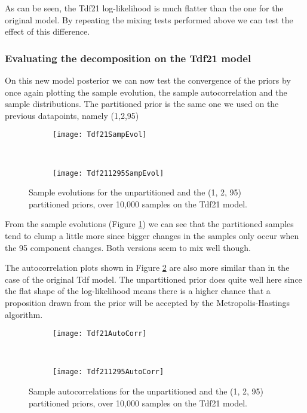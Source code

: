 As can be seen, the Tdf21 log-likelihood is much flatter than the one for the original model. By repeating the mixing tests performed above we can test the effect of this difference.

\subsubsection{Evaluating the decomposition on the Tdf21 model}
On this new model posterior we can now test the convergence of the priors by once again plotting the sample evolution, the sample autocorrelation and the sample distributions. The partitioned prior is the same one we used on the previous datapoints, namely (1,2,95)

\begin{figure}[h]
    \centering
    \begin{subfigure}[t]{0.48\textwidth}
      \texttt{[image: Tdf21SampEvol]}
    \end{subfigure}
    ~
    \begin{subfigure}[t]{0.48\textwidth}
      \texttt{[image: Tdf211295SampEvol]}
    \end{subfigure}
    \caption{Sample evolutions for the unpartitioned and the (1, 2, 95) partitioned priors, over 10,000 samples on the Tdf21 model.}
    \label{fig:tdf21PSampEvol}
\end{figure}

From the sample evolutions (Figure \ref{fig:tdf21PSampEvol}) we can see that the partitioned samples tend to clump a little more since bigger changes in the samples only occur when the 95 component changes. Both versions seem to mix well though.

The autocorrelation plots shown in Figure \ref{fig:tdf21PAutoCorr} are also more similar than in the case of the original Tdf model. The unpartitioned prior does quite well here since the flat shape of the log-likelihood means there is a higher chance that a proposition drawn from the prior will be accepted by the Metropolis-Hastings algorithm.

\begin{figure}[h]
    \centering
    \begin{subfigure}[t]{0.48\textwidth}
      \texttt{[image: Tdf21AutoCorr]}
    \end{subfigure}
    ~
    \begin{subfigure}[t]{0.48\textwidth}
      \texttt{[image: Tdf211295AutoCorr]}
    \end{subfigure}
    \caption{Sample autocorrelations for the unpartitioned and the (1, 2, 95) partitioned priors, over 10,000 samples on the Tdf21 model.}
    \label{fig:tdf21PAutoCorr}
\end{figure}

